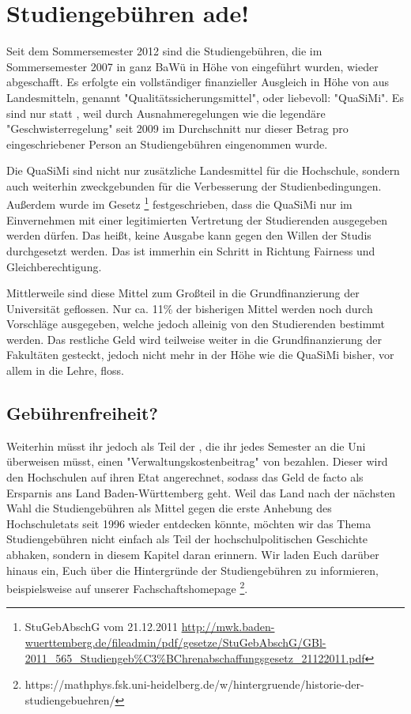 %

\section{Studiengebühren ade!}
Seit dem Sommersemester 2012 sind die Studiengebühren, die im Sommersemester 2007 in ganz BaWü in Höhe von  eingeführt wurden, wieder abgeschafft. Es erfolgte ein vollständiger finanzieller Ausgleich in Höhe von  aus Landesmitteln, genannt "Qualitätssicherungsmittel", oder liebevoll: "QuaSiMi". Es sind nur  statt , weil durch Ausnahmeregelungen wie die legendäre "Geschwisterregelung" seit 2009 im Durchschnitt nur dieser Betrag pro eingeschriebener Person an Studiengebühren eingenommen wurde.

Die QuaSiMi sind nicht nur zusätzliche Landesmittel für die Hochschule, sondern auch weiterhin zweckgebunden für die Verbesserung der Studienbedingungen. Außerdem wurde im Gesetz \footnote{StuGebAbschG vom 21.12.2011 \url{http://mwk.baden-wuerttemberg.de/fileadmin/pdf/gesetze/StuGebAbschG/GBl-2011_565_Studiengeb\%C3\%BChrenabschaffungsgesetz_21122011.pdf}} festgeschrieben, dass die QuaSiMi nur im Einvernehmen mit einer legitimierten Vertretung der Studierenden ausgegeben werden dürfen. Das heißt, keine Ausgabe kann gegen den Willen der Studis durchgesetzt werden. Das ist immerhin ein Schritt in Richtung Fairness und Gleichberechtigung.

Mittlerweile sind diese Mittel zum Großteil in die Grundfinanzierung der Universität geflossen. Nur ca. 11\% der bisherigen Mittel werden noch durch Vorschläge ausgegeben, welche jedoch alleinig von den Studierenden bestimmt werden. Das restliche Geld wird teilweise weiter in die Grundfinanzierung der Fakultäten gesteckt, jedoch nicht mehr in der Höhe wie die QuaSiMi bisher, vor allem in die Lehre, floss.

\subsection*{Gebührenfreiheit?}
Weiterhin müsst ihr jedoch als Teil der \EUR{\beitragssumme}, die ihr jedes Semester an die Uni überweisen müsst, einen "Verwaltungskostenbeitrag" von \EUR{\verwaltungsbetrag} bezahlen. Dieser wird den Hochschulen auf ihren Etat angerechnet, sodass das Geld de facto als Ersparnis ans Land Baden-Württemberg geht. Weil das Land nach der nächsten Wahl die Studiengebühren als Mittel gegen die erste Anhebung des Hochschuletats seit 1996 wieder entdecken könnte, möchten wir das Thema Studiengebühren nicht einfach als Teil der hochschulpolitischen Geschichte abhaken, sondern in diesem Kapitel daran erinnern. Wir laden Euch darüber hinaus ein, Euch über die Hintergründe der Studiengebühren zu informieren, beispielsweise auf unserer Fachschaftshomepage \footnote{https://mathphys.fsk.uni-heidelberg.de/w/hintergruende/historie-der-studiengebuehren/}.

